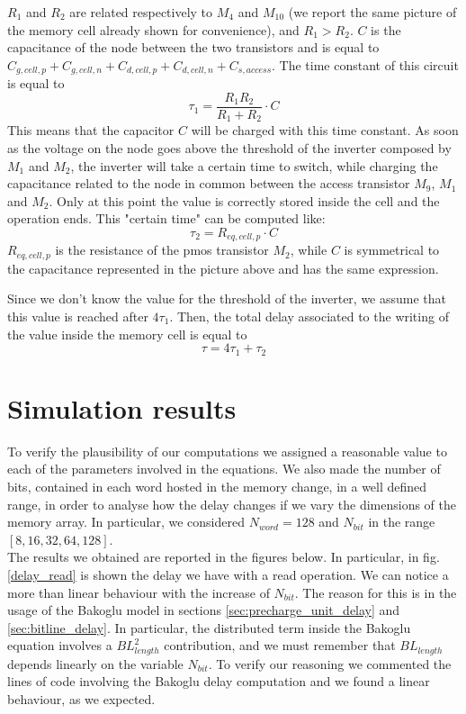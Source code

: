 $R_1$ and $R_2$ are related respectively to $M_4$ and $M_{10}$ (we report the same picture of the memory cell already shown for convenience), and $R_1>R_2$. $C$ is the capacitance of the node between the two transistors and is equal to $C_{g,cell,p}+C_{g,cell,n}+C_{d,cell,p}+C_{d,cell,n}+C_{s,access}$. The time constant of this circuit is equal to $$\tau_1=\frac{R_1R_2}{R_1+R_2}\cdot C$$
This means that the capacitor $C$ will be charged with this time constant. As soon as the voltage on the node goes above the threshold of the inverter composed by $M_1$ and $M_2$, the inverter will take a certain time to switch, while charging the capacitance related to the node in common between the access transistor $M_9$, $M_1$ and $M_2$. Only at this point the value is correctly stored inside the cell and the operation ends. This "certain time" can be computed like: $$\tau_2=R_{eq,cell,p}\cdot C$$
$R_{eq,cell,p}$ is the resistance of the pmos transistor $M_2$, while $C$ is symmetrical to the capacitance represented in the picture above and has the same expression. 

Since we don't know the value for the threshold of the inverter, we assume that this value is reached after $4\tau_1$. Then, the total delay associated to the writing of the value inside the memory cell is equal to
$$\tau=4\tau_1+\tau_2$$

\section{Simulation results}
To verify the plausibility of our computations we assigned a reasonable value to each of the parameters involved in the equations. We also made the number of bits, contained in each word hosted in the memory change, in a well defined range, in order to analyse how the delay changes if we vary the dimensions of the memory array. In particular, we considered $N_{word}=128$ and $N_{bit}$ in the range $[8, 16, 32, 64, 128]$.\\

The results we obtained are reported in the figures below. In particular, in fig. \ref{delay_read} is shown the delay we have with a read operation. We can notice a more than linear behaviour with the increase of $N_{bit}$. The reason for this is in the usage of the Bakoglu model in sections \ref{sec:precharge_unit_delay} and \ref{sec:bitline_delay}. In particular, the distributed term inside the Bakoglu equation involves a $BL_{length}^2$ contribution, and we must remember that $BL_{length}$ depends linearly on the variable $N_{bit}$. To verify our reasoning we commented the lines of code involving the Bakoglu delay computation and we found a linear behaviour, as we expected. 

